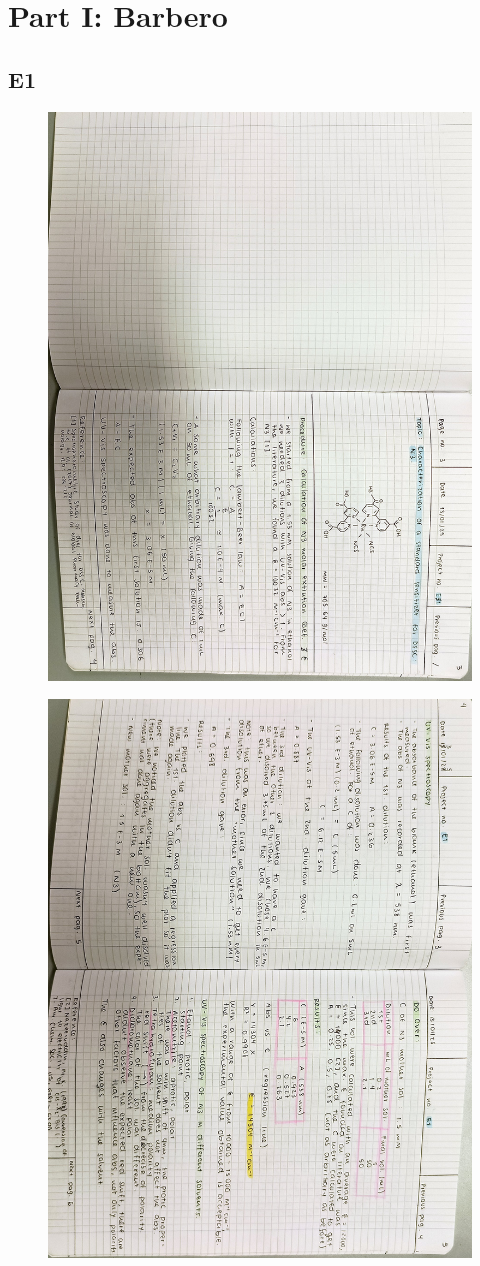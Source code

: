 \section{Part I: Barbero}


\subsection{E1}
\begin{figure}[H]
	\centering
	\includegraphics[width=0.6\linewidth, angle=90]{../images/compressed/IMG20250123172849.jpg}
\end{figure}
\begin{figure}[H]
	\centering
	\includegraphics[width=0.6\linewidth, angle=90]{../images/compressed/IMG20250123172905.jpg}
\end{figure}


